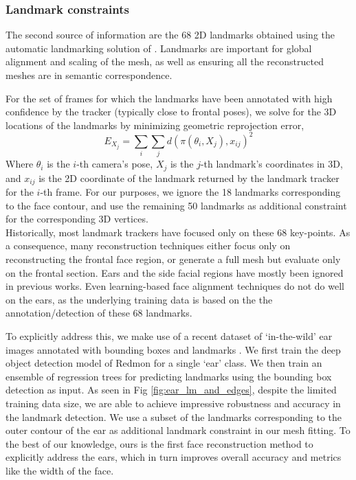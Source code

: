 \documentclass[10pt,twocolumn,letterpaper]{article}
\begin{document}
 
 \subsubsection{Landmark constraints}

 The second source of information are the 68 2D landmarks obtained using the automatic landmarking solution of \cite{baltrusaitis2018openface}. Landmarks are important for global alignment and scaling of the mesh, as well as ensuring all the reconstructed meshes are in semantic correspondence.
 
 For the set of frames for which the landmarks have been annotated with high confidence by the tracker (typically close to frontal poses), we solve for the 3D locations of the landmarks by minimizing geometric reprojection error, 
 \begin{equation}
    E_{X_{j}} = \sum_{i} \sum_{j} d(\pi (\theta_{i},X_{j}),x_{ij})^2
\end{equation}
Where $\theta_i$ is the $i$-th camera's pose, $X_{j}$ is the $j$-th landmark's coordinates in 3D, and $x_{ij}$ is the 2D coordinate of the landmark returned by the landmark tracker for the $i$-th frame. For our purposes, we ignore the 18 landmarks corresponding to the face contour, and use the remaining 50 landmarks as additional constraint for the corresponding 3D vertices.\\


Historically, most landmark trackers have focused only on these 68 key-points. As a consequence, many reconstruction techniques either focus only on reconstructing the frontal face region, or generate a full mesh but evaluate only on the frontal section. Ears and the side facial regions have mostly been ignored in previous works. Even learning-based face alignment techniques do not do well on the ears, as the underlying training data is based on the the annotation/detection of these 68 landmarks.

To explicitly address this, we make use of a recent dataset of `in-the-wild' ear images annotated with bounding boxes and landmarks \cite{zhou2017deformable}. We first train the deep object detection model of Redmon \etal \cite{redmon2017yolo9000} for a single `ear' class. We then train an ensemble of regression trees \cite{kazemi2014one} for predicting landmarks using the bounding box detection as input. As seen in Fig \ref{fig:ear_lm_and_edges}, despite the limited training data size, we are able to achieve impressive robustness and accuracy in the landmark detection. We use a subset of the landmarks corresponding to the outer contour of the ear as additional landmark constraint in our mesh fitting. To the best of our knowledge, ours is the first face reconstruction method to explicitly address the ears, which in turn improves overall accuracy and metrics like the width of the face.
\end{document}
